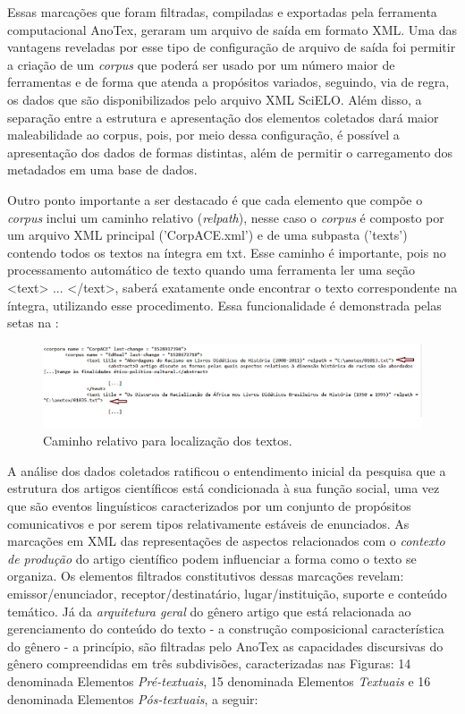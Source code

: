 \documentclass[portuguese]{textolivre}
\begin{document}
Essas marcações que foram filtradas, compiladas e exportadas pela ferramenta computacional AnoTex, geraram um arquivo de saída em formato XML. Uma das vantagens reveladas por esse tipo de configuração de arquivo de saída foi permitir a criação de um \textit{corpus} que poderá ser usado por um número maior de ferramentas e de forma que atenda a propósitos variados, seguindo, via de regra, os dados que são disponibilizados pelo arquivo XML SciELO. Além disso, a separação entre a estrutura e apresentação dos elementos coletados dará maior maleabilidade ao corpus, pois, por meio dessa configuração, é possível a apresentação dos dados de formas distintas, além de permitir o carregamento dos metadados em uma base de dados.

Outro ponto importante a ser destacado é que cada elemento que compõe o \textit{corpus} inclui um caminho relativo (\textit{relpath}), nesse caso o \textit{corpus} é composto por um arquivo XML principal ('CorpACE.xml') e de uma subpasta ('texts') contendo todos os textos na íntegra em txt. Esse caminho é importante, pois no processamento automático de texto quando uma ferramenta ler uma seção <text> ... </text>, saberá exatamente onde encontrar o texto correspondente na íntegra, utilizando esse procedimento. Essa funcionalidade é demonstrada pelas setas na :

\begin{figure}[htbp]
 \centering
 \includegraphics[width=\textwidth]{Fig13.png}
 \caption{Caminho relativo para localização dos textos.}
 \label{fig-13}
\end{figure}

A análise dos dados coletados ratificou o entendimento inicial da pesquisa que a estrutura dos artigos científicos está condicionada à sua função social, uma vez que são eventos linguísticos caracterizados por um conjunto de propósitos comunicativos e por serem tipos relativamente estáveis de enunciados. As marcações em XML das representações de aspectos relacionados com o \textit{contexto de produção} do artigo científico podem influenciar a forma como o texto se organiza. Os elementos filtrados constitutivos dessas marcações revelam: emissor/enunciador, receptor/destinatário, lugar/instituição, suporte e conteúdo temático. Já da \textit{arquitetura geral} do gênero artigo que está relacionada ao gerenciamento do conteúdo do texto - a construção composicional característica do gênero - a princípio, são filtradas pelo AnoTex as capacidades discursivas do gênero compreendidas em três subdivisões, caracterizadas nas Figuras: 14 denominada Elementos \textit{Pré-textuais}, 15 denominada Elementos \textit{Textuais} e 16 denominada Elementos \textit{Pós-textuais}, a seguir:
\end{document}
